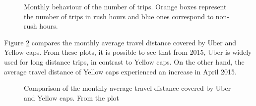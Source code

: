 \begin{figure}%
\centering
{}%
\qquad
{}%
\qquad
{}%
\qquad
{}%
\caption{Monthly behaviour of the number of trips. Orange boxes represent the number of trips in rush hours and blue ones correspond to non-rush hours. }
\label{fig:boxTrips}%
\end{figure}



Figure \ref{fig:boxDistances} compares the monthly average travel distance covered by Uber and Yellow caps. From these plots, it is possible to see that from 2015, Uber is widely used for long distance trips, in contrast to Yellow caps. On the other hand, the average travel distance of Yellow caps experienced an increase in April 2015. 


\begin{figure}%
\centering
{}%
\qquad
{}%
\caption{Comparison of the monthly average travel distance covered by Uber and Yellow caps. From the plot  }
\label{fig:boxDistances}%
\end{figure}
